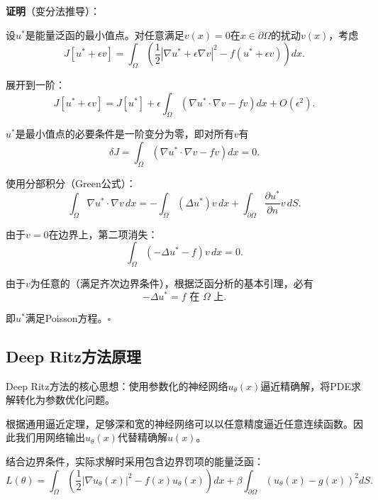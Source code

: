\documentclass{article}
\begin{document}
\textbf{证明}（变分法推导）：

设$u^*$是能量泛函的最小值点。对任意满足$v(x)=0$在$x\in\partial\Omega$的扰动$v(x)$，考虑
\begin{equation}
J[u^* + \epsilon v] = \int_{\Omega}\left(\frac{1}{2}|\nabla u^* + \epsilon\nabla v|^2-f(u^*+\epsilon v)\right)dx.
\end{equation}

展开到一阶：
\begin{equation}
J[u^* + \epsilon v] = J[u^*] + \epsilon \int_{\Omega}(\nabla u^* \cdot \nabla v - fv)dx + O(\epsilon^2).
\end{equation}

$u^*$是最小值点的必要条件是一阶变分为零，即对所有$v$有
\begin{equation}
\delta J = \int_{\Omega}(\nabla u^* \cdot \nabla v - fv)dx = 0.
\end{equation}

使用分部积分（Green公式）：
\begin{equation}
\int_{\Omega}\nabla u^* \cdot \nabla v \, dx = -\int_{\Omega}(\Delta u^*)v \, dx + \int_{\partial\Omega}\frac{\partial u^*}{\partial n}v \, dS.
\end{equation}

由于$v=0$在边界上，第二项消失：
\begin{equation}
\int_{\Omega}(-\Delta u^* - f)v \, dx = 0.
\end{equation}

由于$v$为任意的（满足齐次边界条件），根据泛函分析的基本引理，必有
\begin{equation}
-\Delta u^* = f \text{ 在 } \Omega \text{ 上}.
\end{equation}

即$u^*$满足Poisson方程。\hfill $\square$

\subsection{Deep Ritz方法原理}

Deep Ritz方法的核心思想：使用参数化的神经网络$u_\theta(x)$逼近精确解，将PDE求解转化为参数优化问题。

根据通用逼近定理，足够深和宽的神经网络可以以任意精度逼近任意连续函数。因此我们用网络输出$u_\theta(x)$代替精确解$u(x)$。

结合边界条件，实际求解时采用包含边界罚项的能量泛函：
\begin{equation}
L(\theta)=\int_{\Omega}\left(\frac{1}{2}|\nabla u_\theta(x)|^2-f(x)u_\theta(x)\right) dx +\beta\int_{\partial\Omega}(u_\theta(x)-g(x))^2 dS.
\end{equation}
\end{document}
